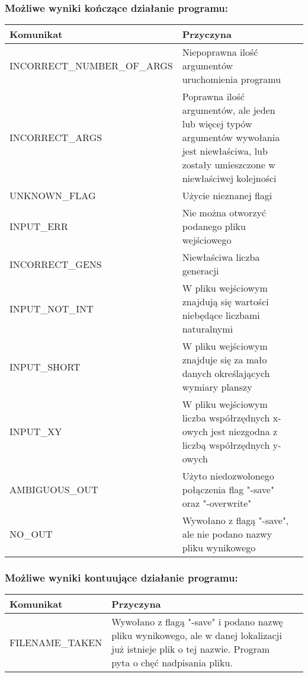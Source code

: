 \documentclass[11pt,a4paper]{report}
\begin{document}
\subsubsection {Możliwe wyniki kończące działanie programu:}
\begin{tabularx}{\textwidth}{  X|Xl  }
 \hline
 Komunikat                                   					& Przyczyna\\
 \hline \hline
			INCORRECT\_NUMBER\_OF\_ARGS	&Niepoprawna ilość argumentów uruchomienia programu\\
 \hline
			INCORRECT\_ARGS			&Poprawna ilość argumentów, ale jeden lub więcej typów argumentów wywołania jest niewłaściwa, lub zostały umieszczone w niewłaściwej kolejności\\
 \hline
			UNKNOWN\_FLAG	 			&Użycie nieznanej flagi\\
 \hline
			INPUT\_ERR					&Nie można otworzyć podanego pliku wejściowego\\
 \hline
			INCORRECT\_GENS				&Niewłaściwa liczba generacji\\
 \hline
			INPUT\_NOT\_INT			&W pliku wejściowym znajdują się wartości niebędące liczbami naturalnymi\\
 \hline
			INPUT\_SHORT				&W pliku wejściowym znajduje się za mało danych określających wymiary planszy\\
 \hline
			INPUT\_XY					&W pliku wejściowym liczba współrzędnych x-owych jest niezgodna z liczbą współrzędnych y-owych\\
\hline
			AMBIGUOUS\_OUT			&Użyto niedozwolonego połączenia flag "-save" oraz "-overwrite"\\
 \hline
			NO\_OUT					&Wywołano z flagą "-save", ale nie podano nazwy pliku wynikowego\\
 \hline
\end{tabularx}

\subsubsection{Możliwe wyniki kontuujące działanie programu:}
\begin{tabularx}{\textwidth}{  X|Xl  }
\hline
   Komunikat                                    				& Przyczyna\\
\hline \hline
			FILENAME\_TAKEN				&Wywołano z flagą "-save" i podano nazwę pliku wynikowego, ale w danej lokalizacji już istnieje plik o tej nazwie. Program pyta o chęć nadpisania pliku.\\
\hline
\end{tabularx}
\end{document}
